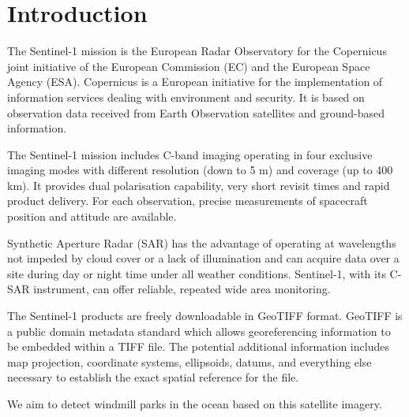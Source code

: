 \section{Introduction}
%

The Sentinel-1 mission is the European Radar Observatory for the Copernicus joint initiative of the European Commission (EC) and the European Space Agency (ESA). Copernicus is a European initiative for the implementation of information services dealing with environment and security. It is based on observation data received from Earth Observation satellites and ground-based information.

The Sentinel-1 mission includes C-band imaging operating in four exclusive imaging modes with different resolution (down to 5 m) and coverage (up to 400 km). It provides dual polarisation capability, very short revisit times and rapid product delivery. For each observation, precise measurements of spacecraft position and attitude are available.

Synthetic Aperture Radar (SAR) has the advantage of operating at wavelengths not impeded by cloud cover or a lack of illumination and can acquire data over a site during day or night time under all weather conditions. Sentinel-1, with its C-SAR instrument, can offer reliable, repeated wide area monitoring.

The Sentinel-1 products are freely downloadable in GeoTIFF format.  GeoTIFF is a public domain metadata standard which allows georeferencing information to be embedded within a TIFF file. The potential additional information includes map projection, coordinate systems, ellipsoids, datums, and everything else necessary to establish the exact spatial reference for the file.

We aim to detect windmill parks in the ocean based on this satellite imagery.